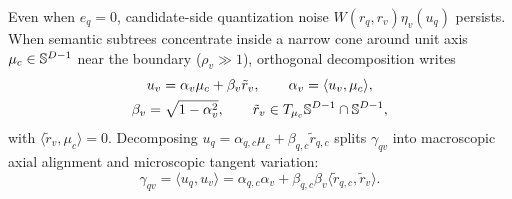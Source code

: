 Even when $e_q = 0$, candidate-side quantization noise $W(r_q, r_v)\eta_v(u_q)$ persists.
When semantic subtrees concentrate inside a narrow cone around unit axis $\mu_c \in \mathbb{S}^{D-1}$ near the boundary ($\rho_v \gg 1$), orthogonal decomposition writes
\begin{equation}
  \begin{gathered}
    u_v = \alpha_v \mu_c + \beta_v \tilde{r}_v, \qquad
    \alpha_v = \langle u_v, \mu_c\rangle, \\
    \beta_v = \sqrt{1 - \alpha_v^2}, \qquad
    \tilde{r}_v \in T_{\mu_c}\mathbb{S}^{D-1} \cap \mathbb{S}^{D-1},
  \end{gathered}
  \label{eq:tangent_decomp}
\end{equation}
with $\langle \tilde{r}_v, \mu_c\rangle = 0$.
Decomposing $u_q = \alpha_{q,c}\mu_c + \beta_{q,c}\tilde{r}_{q,c}$ splits $\gamma_{qv}$ into macroscopic axial alignment and microscopic tangent variation:
\begin{equation}
  \gamma_{qv} = \langle u_q, u_v\rangle = \alpha_{q,c}\alpha_v + \beta_{q,c}\beta_v \langle \tilde{r}_{q,c}, \tilde{r}_v\rangle.
  \label{eq:tangent_inner}
\end{equation}

